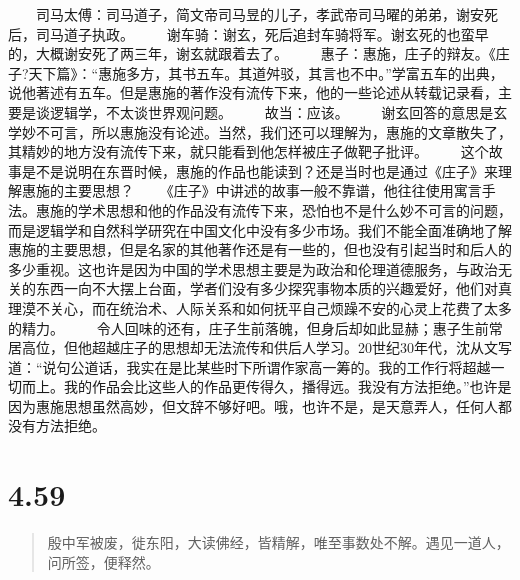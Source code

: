 \documentclass[]{book}
\begin{document}
　　司马太傅：司马道子，简文帝司马昱的儿子，孝武帝司马曜的弟弟，谢安死后，司马道子执政。
　　谢车骑：谢玄，死后追封车骑将军。谢玄死的也蛮早的，大概谢安死了两三年，谢玄就跟着去了。
　　惠子：惠施，庄子的辩友。《庄子?天下篇》：``惠施多方，其书五车。其道舛驳，其言也不中。''学富五车的出典，说他著述有五车。但是惠施的著作没有流传下来，他的一些论述从转载记录看，主要是谈逻辑学，不太谈世界观问题。
　　故当：应该。
　　谢玄回答的意思是玄学妙不可言，所以惠施没有论述。当然，我们还可以理解为，惠施的文章散失了，其精妙的地方没有流传下来，就只能看到他怎样被庄子做靶子批评。
　　这个故事是不是说明在东晋时候，惠施的作品也能读到？还是当时也是通过《庄子》来理解惠施的主要思想？
　　《庄子》中讲述的故事一般不靠谱，他往往使用寓言手法。惠施的学术思想和他的作品没有流传下来，恐怕也不是什么妙不可言的问题，而是逻辑学和自然科学研究在中国文化中没有多少市场。我们不能全面准确地了解惠施的主要思想，但是名家的其他著作还是有一些的，但也没有引起当时和后人的多少重视。这也许是因为中国的学术思想主要是为政治和伦理道德服务，与政治无关的东西一向不大摆上台面，学者们没有多少探究事物本质的兴趣爱好，他们对真理漠不关心，而在统治术、人际关系和如何抚平自己烦躁不安的心灵上花费了太多的精力。
　　令人回味的还有，庄子生前落魄，但身后却如此显赫；惠子生前常居高位，但他超越庄子的思想却无法流传和供后人学习。20世纪30年代，沈从文写道：``说句公道话，我实在是比某些时下所谓作家高一筹的。我的工作行将超越一切而上。我的作品会比这些人的作品更传得久，播得远。我没有方法拒绝。''也许是因为惠施思想虽然高妙，但文辞不够好吧。哦，也许不是，是天意弄人，任何人都没有方法拒绝。

\section{4.59}\label{section-236}

\begin{quote}
殷中军被废，徙东阳，大读佛经，皆精解，唯至事数处不解。遇见一道人，问所签，便释然。
\end{quote}
\end{document}
